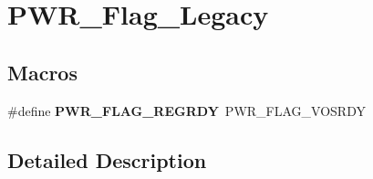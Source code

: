 \hypertarget{group___p_w_r___flag___legacy}{\section{P\-W\-R\-\_\-\-Flag\-\_\-\-Legacy}
\label{group___p_w_r___flag___legacy}
}
\subsection*{Macros}
\begin{DoxyCompactItemize}
\item 
\hypertarget{group___p_w_r___flag___legacy_ga1ada28e60d553d036ebfabdd5566f52b}{\#define {\bfseries P\-W\-R\-\_\-\-F\-L\-A\-G\-\_\-\-R\-E\-G\-R\-D\-Y}~P\-W\-R\-\_\-\-F\-L\-A\-G\-\_\-\-V\-O\-S\-R\-D\-Y}\label{group___p_w_r___flag___legacy_ga1ada28e60d553d036ebfabdd5566f52b}

\end{DoxyCompactItemize}


\subsection{Detailed Description}
